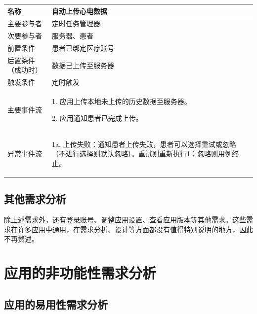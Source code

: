 \begin{table}[!ht]
    \label{tab:uc-upload}
    \begin{tabularx}{\textwidth}{|l|X|}
        \hline
        名称        & 自动上传心电数据  \\
        \hline
        主要参与者     & 定时任务管理器   \\
        \hline
        次要参与者     & 服务器、患者    \\
        \hline
        前置条件      & 患者已绑定医疗账号 \\
        \hline
        后置条件（成功时） & 数据已上传至服务器 \\
        \hline
        触发条件      & 定时触发      \\
        \hline
        主要事件流 &
        \begin{itemizec}
            \item[1.] 应用上传本地未上传的历史数据至服务器。
            \item[2.] 应用通知患者已完成上传。
        \end{itemizec} \\
        \hline
        异常事件流 &
        \begin{itemizec}
            \item[1a.] 上传失败：通知患者上传失败，患者可以选择重试或忽略（不进行选择则默认忽略）。重试则重新执行1；忽略则用例终止。
        \end{itemizec} \\
        \hline
    \end{tabularx}
\end{table}

\subsection{其他需求分析}\label{subsec:other-req}

除上述需求外，还有登录账号、调整应用设置、查看应用版本等其他需求。这些需求在许多应用中通用，在需求分析、设计等方面都没有值得特别说明的地方，因此不再赘述。


\section{应用的非功能性需求分析}\label{sec:nonfunc-req}

\subsection{应用的易用性需求分析}\label{subsec:usability}

